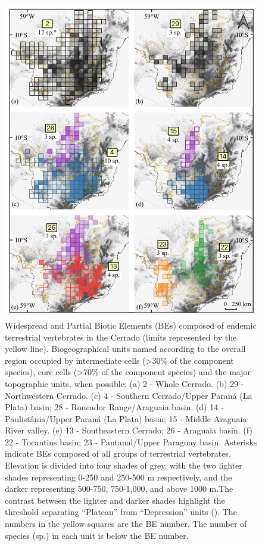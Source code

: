 \documentclass[12pt,openright,oneside,a4paper,english]{abntex2}
\begin{document}
\begin{figure}[H]
	\centering
	\includegraphics[width=150mm]{Fig c2-2}
	\caption[Widespread and partial Biotic Elements (BEs)]{\footnotesize Widespread and Partial Biotic Elements (BEs) composed of endemic terrestrial vertebrates in the Cerrado (limits represented by the yellow line). Biogeographical units named according to the overall region occupied by intermediate cells (>30\% of the component species), core cells (>70\% of the component species) and the major topographic units, when possible: (a) 2 - Whole Cerrado. (b) 29 - Northwestern Cerrado. (c) 4 - Southern Cerrado/Upper Paraná (La Plata) basin; 28 - Roncador Range/Araguaia basin. (d) 14 - Paulistânia/Upper Paraná (La Plata) basin; 15 - Middle Araguaia River valley. (e) 13 - Southeastern Cerrado; 26 - Araguaia basin. (f) 22 - Tocantins basin; 23 - Pantanal/Upper Paraguay basin. Asterisks indicate BEs composed of all groups of terrestrial vertebrates. Elevation is divided into four shades of grey, with the two lighter shades representing 0-250 and 250-500 m respectively, and the darker representing 500-750, 750-1,000, and above 1000 m.The contrast between the lighter and darker shades highlight the threshold separating “Plateau” from “Depression” units (\citealp[see][]{Silva1997}). The numbers in the yellow squares are the BE number. The number of species (sp.) in each unit is below the BE number.}
	\label{fig:fig2-2}
\end{figure}
\end{document}
